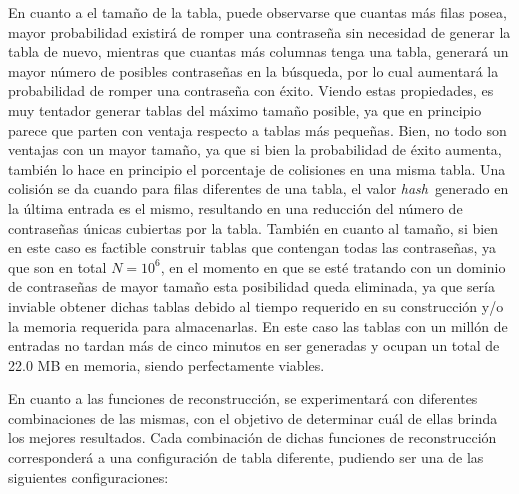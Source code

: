 \documentclass[12pt,spanish,listoffigures,listoftables]{tfgetsinf}
\newcommand{\hash}{\textit{hash}}
\begin{document}
En cuanto a el tamaño de la tabla, puede observarse que cuantas más filas posea, mayor probabilidad existirá de romper una contraseña sin necesidad de generar la tabla de nuevo, mientras que cuantas más columnas tenga una tabla, generará un mayor número de posibles contraseñas en la búsqueda, por lo cual aumentará la probabilidad de romper una contraseña con éxito. Viendo estas propiedades, es muy tentador generar tablas del máximo tamaño posible, ya que en principio parece que parten con ventaja respecto a tablas más pequeñas. Bien, no todo son ventajas con un mayor tamaño, ya que si bien la probabilidad de éxito aumenta, también lo hace en principio el porcentaje de colisiones en una misma tabla. Una colisión se da cuando para filas diferentes de una tabla, el valor \hash~generado en la última entrada es el mismo, resultando en una reducción del número de contraseñas únicas cubiertas por la tabla. También en cuanto al tamaño, si bien en este caso es factible construir tablas que contengan todas las contraseñas, ya que son en total $N = 10^6$, en el momento en que se esté tratando con un dominio de contraseñas de mayor tamaño esta posibilidad queda eliminada, ya que sería inviable obtener dichas tablas debido al tiempo requerido en su construcción y/o la memoria requerida para almacenarlas. En este caso las tablas con un millón de entradas no tardan más de cinco minutos en ser generadas y ocupan un total de 22.0 MB en memoria, siendo perfectamente viables.

En cuanto a las funciones de reconstrucción, se experimentará con diferentes combinaciones de las mismas, con el objetivo de determinar cuál de ellas brinda los mejores resultados. Cada combinación de dichas funciones de reconstrucción corresponderá a una configuración de tabla diferente, pudiendo ser una de las siguientes configuraciones:
\end{document}
